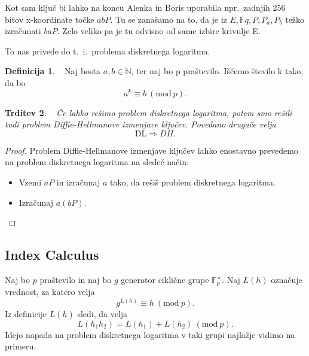 \documentclass[12pt,a4paper,twoside]{article}
\theoremstyle{definition} %
\newtheorem{definicija}{Definicija}[section]
\theoremstyle{plain} %
\newtheorem{trditev}[definicija]{Trditev}
\numberwithin{equation}{section}  %
\newcommand{\N}{\mathbb N}
\newcommand{\F}{\mathbb F}
\begin{document}
Kot sam ključ bi lahko na koncu Alenka in Boris uporabila npr.\  zadnjih $256$ bitov x-koordinate točke $abP$. Tu se zanašamo na to, da je iz $E, \F{q},P, P_a, P_b$ težko izračunati $baP$. Zelo veliko pa je tu odvisno od same izbire krivulje E.

To nas privede do t.\ i.\ problema diskretnega logaritma.


\begin{definicija}~
Naj bosta $a, b \in \N$, ter naj bo p praštevilo. Iščemo število k tako, da bo
$$a^k \equiv b\ (\text{mod} \ p).$$
\end{definicija}

\begin{trditev}~
Če lahko rešimo problem diskretnega logaritma, potem smo rešili tudi problem Diffie-Hellmanove izmenjave ključev. Povedano drugače velja
$$\text{DL} \Rightarrow DH.$$
\end{trditev}

\begin{proof}
Problem Diffie-Hellmanove izmenjave ključev lahko enostavno prevedemo na problem diskretnega logaritma na sledeč način:

\begin{itemize}
\item Vzemi $aP$ in izračunaj $a$ tako, da rešiš problem diskretnega logaritma.
\item Izračunaj $a(bP)$.
\end{itemize}

\end{proof}

\subsection{Index Calculus}
\label{IndexCalc}

Naj bo $p$ praštevilo in naj bo $g$ generator ciklične grupe $\F^{\times}_{p}$. Naj $L(h)$ označuje vrednost, za katero velja
$$g^{L(h)} \equiv h \ (\text{mod} \ p).$$
Iz definicije $L(h)$ sledi, da velja $$L(h_1h_2) = L(h_1)+L(h_2) \ (\text{mod} \ p).$$
Idejo napada na problem diskretnega logaritma v taki grupi najlažje vidimo na primeru.
\end{document}
